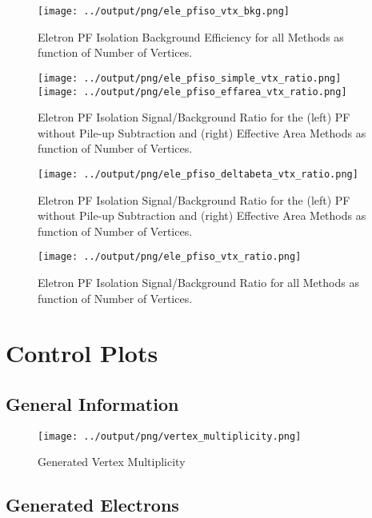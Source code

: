 \documentclass[11pt]{book}
\begin{document}
\begin{figure}[htb]
\centering
\texttt{[image: ../output/png/ele\_pfiso\_vtx\_bkg.png]}
\caption{Eletron PF Isolation Background Efficiency for all Methods as function of Number of Vertices.}
\label{fig:ele_pfiso_vtx_bkg}
\end{figure}

\begin{figure}[htb]
\centering
\texttt{[image: ../output/png/ele\_pfiso\_simple\_vtx\_ratio.png]}
\texttt{[image: ../output/png/ele\_pfiso\_effarea\_vtx\_ratio.png]}
\caption{Eletron PF Isolation Signal/Background Ratio for the (left) PF without Pile-up Subtraction and (right) Effective Area Methods as function of Number of Vertices.}
\label{fig:ele_pfiso_vtx_ratio_simple_effarea}
\end{figure}

\begin{figure}[htb]
\centering
\texttt{[image: ../output/png/ele\_pfiso\_deltabeta\_vtx\_ratio.png]}
\caption{Eletron PF Isolation Signal/Background Ratio for the (left) PF without Pile-up Subtraction and (right) Effective Area Methods as function of Number of Vertices.}
\label{fig:ele_pfiso_vtx_ratio_deltabeta}
\end{figure}

\begin{figure}[htb]
\centering
\texttt{[image: ../output/png/ele\_pfiso\_vtx\_ratio.png]}
\caption{Eletron PF Isolation Signal/Background Ratio for all Methods as function of Number of Vertices.}
\label{fig:ele_pfiso_vtx_ratio}
\end{figure}
\clearpage

\chapter{Control Plots}
\section{General Information}
\begin{figure}[htb]
\centering
\texttt{[image: ../output/png/vertex\_multiplicity.png]}
\caption{Generated Vertex Multiplicity}
\label{fig:vertex_multiplicity}
\end{figure}
\clearpage
\clearpage

\section{Generated Electrons}
\end{document}
